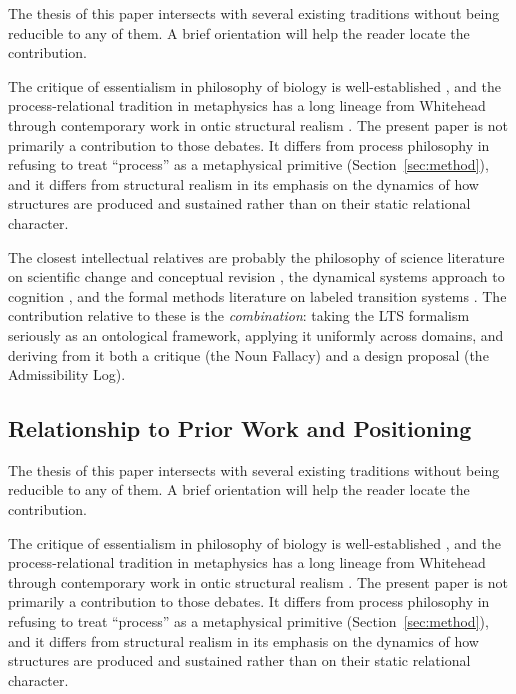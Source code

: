 \documentclass[12pt, a4paper]{article}
\theoremstyle{plain}
\theoremstyle{definition}
\theoremstyle{remark}
\begin{document}
The thesis of this paper intersects with several existing traditions without
being reducible to any of them. A brief orientation will help the reader
locate the contribution.

The critique of essentialism in philosophy of biology is well-established
\citep{hull1965,sober1980}, and the process-relational tradition in metaphysics
has a long lineage from Whitehead through contemporary work in ontic structural
realism \citep{ladyman2007}. The present paper is not primarily a contribution
to those debates. It differs from process philosophy in refusing to treat
``process'' as a metaphysical primitive (Section~\ref{sec:method}), and it
differs from structural realism in its emphasis on the dynamics of how
structures are produced and sustained rather than on their static relational
character.

The closest intellectual relatives are probably the philosophy of science
literature on scientific change and conceptual revision
\citep{kuhn1962,laudan1977}, the dynamical systems approach to cognition
\citep{thelen1994,beer2000}, and the formal methods literature on labeled
transition systems \citep{milner1989,hoare1985}. The contribution relative
to these is the \emph{combination}: taking the LTS formalism seriously as
an ontological framework, applying it uniformly across domains, and deriving
from it both a critique (the Noun Fallacy) and a design proposal (the
Admissibility Log).

\subsection{Relationship to Prior Work and Positioning}

The thesis of this paper intersects with several existing traditions without
being reducible to any of them. A brief orientation will help the reader
locate the contribution.

The critique of essentialism in philosophy of biology is well-established
\citep{hull1965,sober1980}, and the process-relational tradition in metaphysics
has a long lineage from Whitehead through contemporary work in ontic structural
realism \citep{ladyman2007}. The present paper is not primarily a contribution
to those debates. It differs from process philosophy in refusing to treat
``process'' as a metaphysical primitive (Section~\ref{sec:method}), and it
differs from structural realism in its emphasis on the dynamics of how
structures are produced and sustained rather than on their static relational
character.
\end{document}
